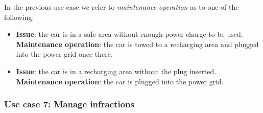 		In the previous use case we refer to \textit{maintenance operation} as to one of the following:
		\begin{itemize}
			\item \textbf{Issue}: the car is in a safe area without enough power charge to be used. \textbf{Maintenance operation}: the car is towed to a recharging area and plugged into the power grid once there.
			\item \textbf{Issue}: the car is in a recharging area without the plug inserted. \textbf{Maintenance operation}: the car is plugged into the power grid.
		\end{itemize}
	
	\subsubsection{Use case 7: Manage infractions}

